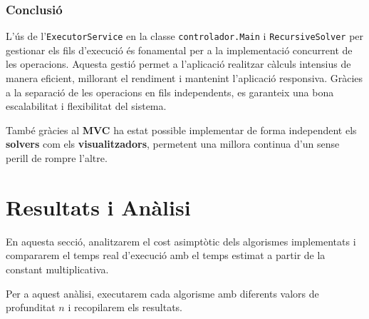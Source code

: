 \documentclass{ieeetj}
\begin{document}
\subsubsection{Conclusió}
L'ús de l'\texttt{ExecutorService} en la classe \texttt{controlador.Main} i \texttt{RecursiveSolver} per gestionar els fils d'execució és fonamental per a la implementació concurrent de les operacions. Aquesta gestió permet a l'aplicació realitzar càlculs intensius de manera eficient, millorant el rendiment i mantenint l'aplicació responsiva. Gràcies a la separació de les operacions en fils independents, es garanteix una bona escalabilitat i flexibilitat del sistema.

També gràcies al \textbf{MVC} ha estat possible implementar de forma independent els \textbf{solvers} com els \textbf{visualitzadors}, permetent una millora continua d'un sense perill de rompre l'altre.

\section{Resultats i Anàlisi}
En aquesta secció, analitzarem el cost asimptòtic dels algorismes implementats i compararem el temps real d'execució amb el temps estimat a partir de la constant multiplicativa.  

Per a aquest anàlisi, executarem cada algorisme amb diferents valors de profunditat \( n \) i recopilarem els resultats.  
\end{document}
